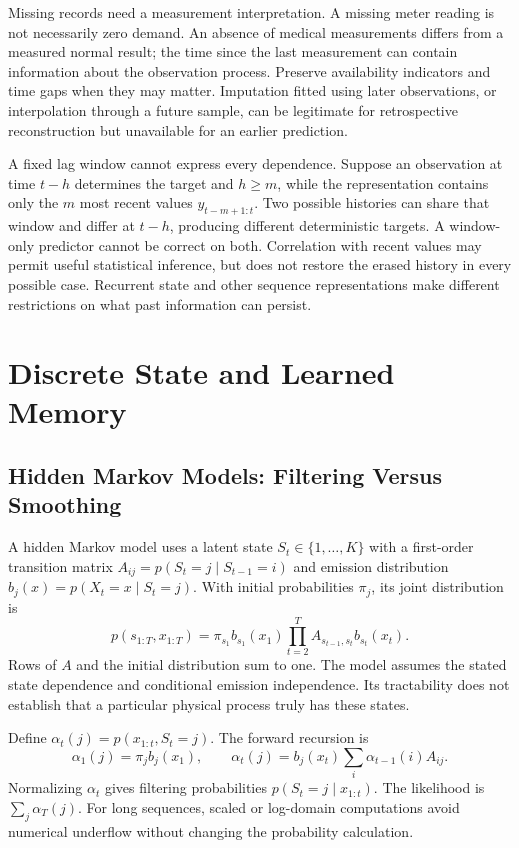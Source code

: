 Missing records need a measurement interpretation. A missing meter reading is not necessarily zero demand. An absence of medical measurements differs from a measured normal result; the time since the last measurement can contain information about the observation process. Preserve availability indicators and time gaps when they may matter. Imputation fitted using later observations, or interpolation through a future sample, can be legitimate for retrospective reconstruction but unavailable for an earlier prediction.

A fixed lag window cannot express every dependence. Suppose an observation at time $t-h$ determines the target and $h\ge m$, while the representation contains only the $m$ most recent values $y_{t-m+1:t}$. Two possible histories can share that window and differ at $t-h$, producing different deterministic targets. A window-only predictor cannot be correct on both. Correlation with recent values may permit useful statistical inference, but does not restore the erased history in every possible case. Recurrent state and other sequence representations make different restrictions on what past information can persist.

\section{Discrete State and Learned Memory}

\subsection{Hidden Markov Models: Filtering Versus Smoothing}

A hidden Markov model uses a latent state $S_t\in\{1,\ldots,K\}$ with a first-order transition matrix $A_{ij}=p(S_t=j\mid S_{t-1}=i)$ and emission distribution $b_j(x)=p(X_t=x\mid S_t=j)$. With initial probabilities $\pi_j$, its joint distribution is
\[
 p(s_{1:T},x_{1:T})=\pi_{s_1}b_{s_1}(x_1)
 \prod_{t=2}^{T}A_{s_{t-1},s_t}b_{s_t}(x_t).
\]
Rows of $A$ and the initial distribution sum to one. The model assumes the stated state dependence and conditional emission independence. Its tractability does not establish that a particular physical process truly has these states.

Define $\alpha_t(j)=p(x_{1:t},S_t=j)$. The forward recursion is
\[
 \alpha_1(j)=\pi_jb_j(x_1),\qquad
 \alpha_t(j)=b_j(x_t)\sum_i\alpha_{t-1}(i)A_{ij}.
\]
Normalizing $\alpha_t$ gives filtering probabilities $p(S_t=j\mid x_{1:t})$. The likelihood is $\sum_j\alpha_T(j)$. For long sequences, scaled or log-domain computations avoid numerical underflow without changing the probability calculation.

